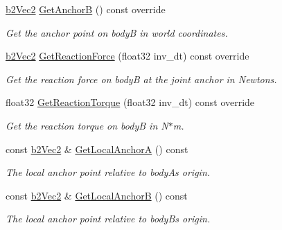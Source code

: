 \begin{DoxyCompactItemize}
\mbox{\label{classb2RopeJoint_a5e1d615b5cff50b367a74e109184e5d5}} 
\hyperlink{structb2Vec2}{b2\+Vec2} \hyperlink{classb2RopeJoint_a5e1d615b5cff50b367a74e109184e5d5}{Get\+AnchorB} () const override
\begin{DoxyCompactList}\small\item\em Get the anchor point on bodyB in world coordinates. \end{DoxyCompactList}\item 
\mbox{\label{classb2RopeJoint_a4637fe7f22383bbc00d23ab4961b1146}} 
\hyperlink{structb2Vec2}{b2\+Vec2} \hyperlink{classb2RopeJoint_a4637fe7f22383bbc00d23ab4961b1146}{Get\+Reaction\+Force} (float32 inv\+\_\+dt) const override
\begin{DoxyCompactList}\small\item\em Get the reaction force on bodyB at the joint anchor in Newtons. \end{DoxyCompactList}\item 
\mbox{\label{classb2RopeJoint_ab3d2e29e34ab2fc6a2e23c055d865c18}} 
float32 \hyperlink{classb2RopeJoint_ab3d2e29e34ab2fc6a2e23c055d865c18}{Get\+Reaction\+Torque} (float32 inv\+\_\+dt) const override
\begin{DoxyCompactList}\small\item\em Get the reaction torque on bodyB in N$\ast$m. \end{DoxyCompactList}\item 
\mbox{\label{classb2RopeJoint_a5fb600991e676e61e266ecb99448bb86}} 
const \hyperlink{structb2Vec2}{b2\+Vec2} \& \hyperlink{classb2RopeJoint_a5fb600991e676e61e266ecb99448bb86}{Get\+Local\+AnchorA} () const
\begin{DoxyCompactList}\small\item\em The local anchor point relative to bodyA\textquotesingle{}s origin. \end{DoxyCompactList}\item 
\mbox{\label{classb2RopeJoint_a8a9b925c7ffa11d331ba369cc9fe2ac5}} 
const \hyperlink{structb2Vec2}{b2\+Vec2} \& \hyperlink{classb2RopeJoint_a8a9b925c7ffa11d331ba369cc9fe2ac5}{Get\+Local\+AnchorB} () const
\begin{DoxyCompactList}\small\item\em The local anchor point relative to bodyB\textquotesingle{}s origin. \end{DoxyCompactList}\item 

\end{DoxyCompactItemize}
